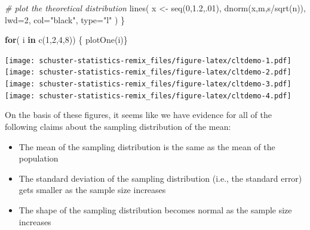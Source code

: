 \documentclass[
]{book}
\newenvironment{Shaded}{\begin{snugshade}}{\end{snugshade}}
\newcommand{\AttributeTok}[1]{\textcolor[rgb]{0.77,0.63,0.00}{#1}}
\newcommand{\CommentTok}[1]{\textcolor[rgb]{0.56,0.35,0.01}{\textit{#1}}}
\newcommand{\ControlFlowTok}[1]{\textcolor[rgb]{0.13,0.29,0.53}{\textbf{#1}}}
\newcommand{\DecValTok}[1]{\textcolor[rgb]{0.00,0.00,0.81}{#1}}
\newcommand{\FloatTok}[1]{\textcolor[rgb]{0.00,0.00,0.81}{#1}}
\newcommand{\FunctionTok}[1]{\textcolor[rgb]{0.00,0.00,0.00}{#1}}
\newcommand{\NormalTok}[1]{#1}
\newcommand{\OtherTok}[1]{\textcolor[rgb]{0.56,0.35,0.01}{#1}}
\newcommand{\SpecialCharTok}[1]{\textcolor[rgb]{0.00,0.00,0.00}{#1}}
\newcommand{\StringTok}[1]{\textcolor[rgb]{0.31,0.60,0.02}{#1}}
\providecommand{\tightlist}{%
  \setlength{\itemsep}{0pt}\setlength{\parskip}{0pt}}
\begin{document}
\begin{Shaded}
\begin{Highlighting}[]
        \CommentTok{\# plot the theoretical distribution}
        \FunctionTok{lines}\NormalTok{( x }\OtherTok{\textless{}{-}} \FunctionTok{seq}\NormalTok{(}\DecValTok{0}\NormalTok{,}\FloatTok{1.2}\NormalTok{,.}\DecValTok{01}\NormalTok{), }\FunctionTok{dnorm}\NormalTok{(x,m,s}\SpecialCharTok{/}\FunctionTok{sqrt}\NormalTok{(n)), }
            \AttributeTok{lwd=}\DecValTok{2}\NormalTok{, }\AttributeTok{col=}\StringTok{"black"}\NormalTok{, }\AttributeTok{type=}\StringTok{"l"}
\NormalTok{        )}
\NormalTok{    \}}
    
    \ControlFlowTok{for}\NormalTok{( i }\ControlFlowTok{in} \FunctionTok{c}\NormalTok{(}\DecValTok{1}\NormalTok{,}\DecValTok{2}\NormalTok{,}\DecValTok{4}\NormalTok{,}\DecValTok{8}\NormalTok{)) \{}
        \FunctionTok{plotOne}\NormalTok{(i)\}}
\end{Highlighting}
\end{Shaded}

\texttt{[image: schuster-statistics-remix\_files/figure-latex/cltdemo-1.pdf]} \texttt{[image: schuster-statistics-remix\_files/figure-latex/cltdemo-2.pdf]} \texttt{[image: schuster-statistics-remix\_files/figure-latex/cltdemo-3.pdf]} \texttt{[image: schuster-statistics-remix\_files/figure-latex/cltdemo-4.pdf]}

On the basis of these figures, it seems like we have evidence for all of the following claims about the sampling distribution of the mean:

\begin{itemize}
\tightlist
\item
  The mean of the sampling distribution is the same as the mean of the population
\item
  The standard deviation of the sampling distribution (i.e., the standard error) gets smaller as the sample size increases
\item
  The shape of the sampling distribution becomes normal as the sample size increases
\end{itemize}
\end{document}
